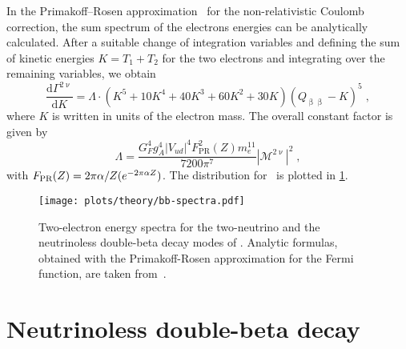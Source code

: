 In the Primakoff–Rosen approximation~\cite{Primakoff1959} for the
non-relativistic Coulomb correction, the sum spectrum of the electrons energies
can be analytically calculated. After a suitable change of integration
variables and defining the sum of kinetic energies $K=T_1+T_2$ for the two
electrons and integrating over the remaining variables, we obtain
\begin{equation}\label{eq:nbb:stdmodel}
  \frac{\text{d}\Gamma^{2\upnu}}{\text{d}K} =
  \Lambda \cdot (K^5+10K^4+40K^3+60K^2+30K) {(Q_{\upbeta\upbeta}-K)}^5 \;,
\end{equation}
where $K$ is written in units of the electron mass. The overall constant factor
is given by
\[
  \Lambda = \frac{G_F^4g_A^4|V_{ud}|^4F^2_\text{PR}(Z)m_e^{11}}{7200\pi^7}
            |\mathcal{M}^{2\upnu}|^2 \;,
\]
with $F_\text{PR}(Z) = 2\pi\alpha/Z(\-e^{-2\pi\alpha Z})$. The distribution for
\gesix\ is plotted in \cref{fig:nbb:spectra}.

\begin{figure}
  \centering
  \texttt{[image: plots/theory/bb-spectra.pdf]}
  \caption{%
    Two-electron energy spectra for the two-neutrino and the neutrinoless
    double-beta decay modes of \gesix. Analytic formulas, obtained with the
    Primakoff-Rosen approximation for the Fermi function, are taken
    from~\cite{Tretyak1995, Tretyak2002}.
  }\label{fig:nbb:spectra}
\end{figure}

\section{Neutrinoless double-beta decay}%
\label{sec:nbb:0nbb}

